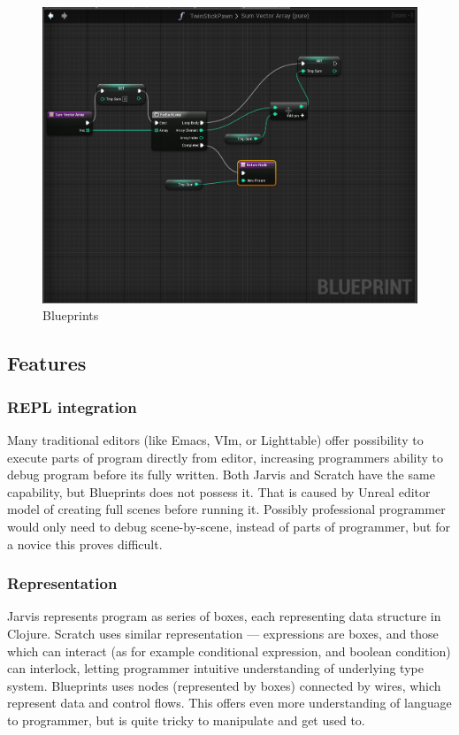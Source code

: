 \documentclass[11pt]{scrartcl}
\begin{document}
\begin{figure}[hbt]
  \centering
  \includegraphics[scale=0.3]{img/b-wires}
  \caption{Blueprints}
\label{fig:blueprints}
\end{figure}

\subsection{Features}

\subsubsection*{REPL integration}
Many traditional editors (like Emacs, VIm, or Lighttable) offer possibility to
execute parts of program directly from editor, increasing programmers ability to
debug program before its fully written.
Both Jarvis and Scratch have the same capability, but Blueprints does not
possess it. That is caused by Unreal editor model of creating full scenes before
running it. Possibly professional programmer would only need to debug
scene-by-scene, instead of parts of programmer, but for a novice this proves
difficult.

\subsubsection*{Representation}
Jarvis represents program as series of boxes, each representing data structure
in Clojure. Scratch uses similar representation --- expressions are boxes, and
those which can interact (as for example conditional expression, and boolean
condition) can interlock, letting programmer intuitive understanding of
underlying type system. Blueprints uses nodes (represented by boxes) connected
by wires, which represent data and control flows. This offers even more
understanding of language to programmer, but is quite tricky to manipulate and
get used to.
\end{document}
